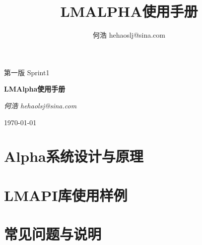 \documentclass[11pt]{report}
\title{LMALPHA使用手册}
\author{何浩 hehaoslj@sina.com}
\begin{document}
\begin{titlepage}
{\large    第一版 \faDotCircleO }
{\normalsize    Sprint1 }


\begin{center}
{\Huge\bfseries
LMAlpha使用手册}

\bigskip
{\Large\itshape
何浩 hehaolsj@sina.com}

\medskip
\today
\end{center}
\end{titlepage}

\tableofcontents

\part[系统设计]{Alpha系统设计与原理}



\part[用例]{LMAPI库使用样例}



\part[FAQ]{常见问题与说明}

\end{document}
